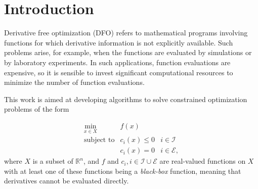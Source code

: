 \documentclass{article}
\theoremstyle{case}
\newcommand{\domain}{X}
\newcommand{\real}{\mathbb R}
\begin{document}
\tableofcontents

\newpage

%
%
%
%
%
%




\section{Introduction}

Derivative free optimization (DFO) refers to mathematical programs involving functions for which derivative information is not explicitly available.
Such problems arise, for example, when the functions are evaluated by simulations or by laboratory experiments.
In such applications, function evaluations are expensive, so it is sensible to invest significant computational resources to minimize the number of function evaluations.

This work is aimed at developing algorithms to solve constrained optimization problems of the form 

\[ \begin{array}{ccl} \min_{x \in \domain} & f(x) \\
\mbox{subject to} & c_i(x) \le 0 & i \in \mathcal{I} \\
& c_i(x) = 0 & i \in \mathcal{E},
\end{array}
\]
where $\domain$ is a subset of $\real^n$, and $f$ and $c_i, i \in \mathcal{I} \cup \mathcal{E}$ are real-valued functions on $X$ with at least one of these functions being a {\em black-box} function, meaning that derivatives cannot be evaluated directly.
\end{document}

